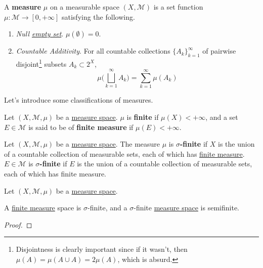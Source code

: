   \begin{definition}[Measure]
    \label{def:measure}
    A \textbf{measure} $\mu$ on a measurable space $(X, \mathcal{M})$ is a set function $\mu: \mathcal{M} \to [0, +\infty]$ satisfying the following. 
    \begin{enumerate}
      \item \textit{Null \hyperref[st-def:empty-set]{empty set}}. $\mu(\emptyset) = 0$. 
      \item \textit{Countable Additivity}. For all countable collections $\{A_k\}_{k=1}^\infty$ of pairwise disjoint\footnote{Disjointness is clearly important since if it wasn't, then $\mu(A) = \mu(A \cup A) = 2 \mu(A)$, which is absurd. } subsets $A_k \subset 2^{X}$,
      \begin{equation}
        \mu \bigg( \bigsqcup_{k=1}^\infty A_k \bigg) = \sum_{k=1}^\infty \mu(A_k)
      \end{equation}
    \end{enumerate} 
  \end{definition}

	Let's introduce some classifications of measures. 

	\begin{definition}
	  \label{def:finite-measure}
		Let $(X, \mathcal{M}, \mu)$ be a \hyperref[def:measure-space]{measure space}. $\mu$ is \textbf{finite} if $\mu(X) < +\infty$, and a set $E \in \mathcal{M}$ is said to be of \textbf{finite measure} if $\mu(E) < +\infty$. 
	\end{definition}

	\begin{definition}
	  \label{def:sigma-finite-measure}
		Let $(X, \mathcal{M}, \mu)$ be a \hyperref[def:measure-space]{measure space}. The measure $\mu$ is \textbf{$\sigma$-finite} if $X$ is the union of a countable collection of measurable sets, each of which has \hyperref[def:finite-measure]{finite measure}. $E \in \mathcal{M}$ is \textbf{$\sigma$-finite} if $E$ is the union of a countable collection of measurable sets, each of which has finite measure. 
	\end{definition}

	\begin{definition}
	  \label{def:semifinite-measure}
		Let $(X, \mathcal{M}, \mu)$ be a \hyperref[def:measure-space]{measure space}. 
	\end{definition}
	
	\begin{lemma}
	  \label{thm:finiteness-hierarchy}
		A \hyperref[def:finite-measure]{finite measure} space is $\sigma$-finite, and a $\sigma$-finite \hyperref[def:measure-space]{measure space} is semifinite. 
	\end{lemma}
	\begin{proof}
	  
	\end{proof}

